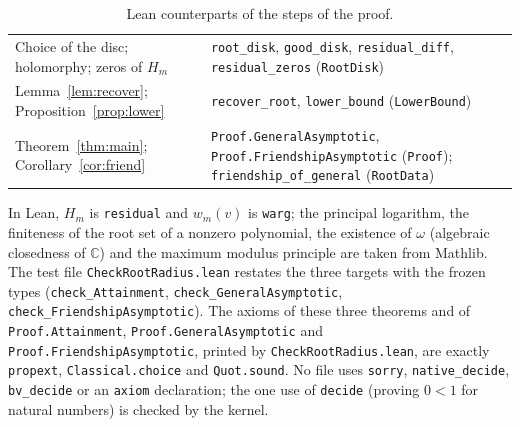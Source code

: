 \documentclass[11pt]{article}
\theoremstyle{definition}
\theoremstyle{remark}
\newcommand{\C}{\mathbb C}
\begin{document}
{\begin{table}[ht]
\begin{tabular}{@{}>{\raggedright\arraybackslash}p{}>{\raggedright\arraybackslash}p{}@{}}
Choice of the disc; holomorphy; zeros of $H_m$ & \texttt{root\_disk},
\texttt{good\_disk}, \texttt{residual\_diff}, \texttt{residual\_zeros}
(\texttt{RootDisk}) \\
Lemma~\ref{lem:recover}; Proposition~\ref{prop:lower} &
\texttt{recover\_root}, \texttt{lower\_bound} (\texttt{LowerBound}) \\
Theorem~\ref{thm:main}; Corollary~\ref{cor:friend} &
\texttt{Proof.GeneralAsymptotic}, \texttt{Proof.FriendshipAsymptotic}
(\texttt{Proof}); \texttt{friendship\_of\_general} (\texttt{RootData}) \\
\hline
\end{tabular}
\caption{Lean counterparts of the steps of the proof.}
\label{tab:lean}
\end{table}

\noindent In Lean, $H_m$ is \texttt{residual} and $w_m(v)$ is
\texttt{warg}; the principal logarithm, the finiteness of the root set of a
nonzero polynomial, the existence of $\omega$ (algebraic closedness of $\C$)
and the maximum modulus principle are taken from Mathlib. The test file
\texttt{CheckRootRadius.lean} restates the three targets with the frozen
types (\texttt{check\_\allowbreak Attainment},
\texttt{check\_\allowbreak GeneralAsymptotic},
\texttt{check\_\allowbreak FriendshipAsymptotic}). The axioms of these three
theorems and of \texttt{Proof.Attainment}, \texttt{Proof.GeneralAsymptotic}
and \texttt{Proof.FriendshipAsymptotic}, printed by
\texttt{CheckRootRadius.lean}, are exactly \texttt{propext},
\texttt{Classical.choice} and \texttt{Quot.sound}. No file uses
\texttt{sorry}, \texttt{native\_\allowbreak decide},
\texttt{bv\_\allowbreak decide} or an \texttt{axiom} declaration; the one use
of \texttt{decide} (proving $0<1$ for natural numbers) is checked by the
kernel.

}
\end{document}
